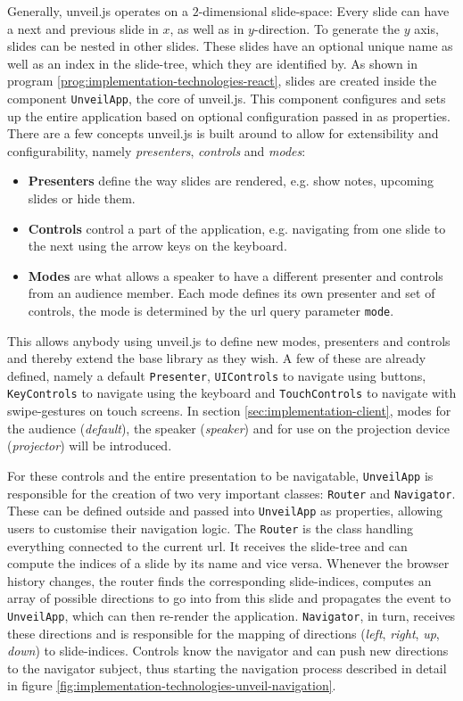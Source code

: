 Generally, unveil.js operates on a $2$-dimensional slide-space: Every slide can have a next and previous slide in $x$, as well as in $y$-direction. To generate the $y$ axis, slides can be nested in other slides. These slides have an optional unique name as well as an index in the slide-tree, which they are identified by. As shown in program \ref{prog:implementation-technologies-react}, slides are created inside the component \texttt{UnveilApp}, the core of unveil.js. This component configures and sets up the entire application based on optional configuration passed in as properties.
There are a few concepts unveil.js is built around to allow for extensibility and configurability, namely \emph{presenters}, \emph{controls} and \emph{modes}:
%
\begin{itemize}
\item \textbf{Presenters} define the way slides are rendered, e.g. show notes, upcoming slides or hide them.
\item \textbf{Controls} control a part of the application, e.g. navigating from one slide to the next using the arrow keys on the keyboard.
\item \textbf{Modes} are what allows a speaker to have a different presenter and controls from an audience member. Each mode defines its own presenter and set of controls, the mode is determined by the url query parameter \texttt{mode}.
\end{itemize}
This allows anybody using unveil.js to define new modes, presenters and controls and thereby extend the base library as they wish. A few of these are already defined, namely a default \texttt{Presenter}, \texttt{UIControls} to navigate using buttons, \texttt{KeyControls} to navigate using the keyboard and \texttt{TouchControls} to navigate with swipe-gestures on touch screens. In section \ref{sec:implementation-client}, modes for the audience (\emph{default}), the speaker (\emph{speaker}) and for use on the projection device (\emph{projector}) will be introduced.

For these controls and the entire presentation to be navigatable, \texttt{Un\-veil\-App} is responsible for the creation of two very important classes: \texttt{Router} and \texttt{Navigator}. These can be defined outside and passed into \texttt{UnveilApp} as properties, allowing users to customise their navigation logic.
%
The \texttt{Router} is the class handling everything connected to the current url. It receives the slide-tree and can compute the indices of a slide by its name and vice versa. Whenever the browser history changes, the router finds the corresponding slide-indices, computes an array of possible directions to go into from this slide and propagates the event to \texttt{UnveilApp}, which can then re-render the application.
\texttt{Navigator}, in turn, receives these directions and is responsible for the mapping of directions (\emph{left}, \emph{right}, \emph{up}, \emph{down}) to slide-indices. Controls know the navigator and can push new directions to the navigator subject, thus starting the navigation process described in detail in figure \ref{fig:implementation-technologies-unveil-navigation}.

